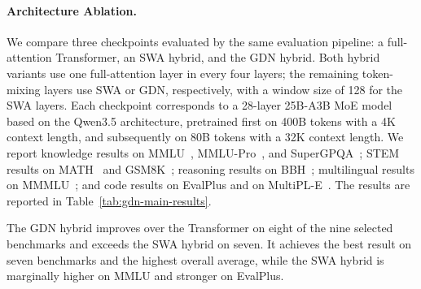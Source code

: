 \paragraph{Architecture Ablation.}
\label{sec:gdn-ablation}

We compare three checkpoints evaluated by the same evaluation pipeline: a full-attention Transformer, an SWA hybrid, and the GDN hybrid. Both hybrid variants use one full-attention layer in every four layers; the remaining token-mixing layers use SWA or GDN, respectively, with a window size of 128 for the SWA layers. Each checkpoint corresponds to a 28-layer 25B-A3B MoE model based on the Qwen3.5 architecture, pretrained first on 400B tokens with a 4K context length, and subsequently on 80B tokens with a 32K context length. We report knowledge results on MMLU~\citep{mmlu}, MMLU-Pro~\citep{wang2024mmlu}, and SuperGPQA~\citep{supergpqa}; STEM results on MATH~\citep{hendrycks2021measuring} and GSM8K~\citep{cobbe2021training}; reasoning results on BBH~\citep{suzgun2022bbh}; multilingual results on MMMLU~\citep{openai2024mmmlu}; and code results on EvalPlus and on MultiPL-E~\citep{cassano2023multipl}. The results are reported in Table~\ref{tab:gdn-main-results}.

\begin{table}[t]
\centering
\small
\setlength{\tabcolsep}{3.5pt}
\caption{Architecture comparison. All values are percentages and higher is better. EvalPlus and MultiPL-E are reported with pass@1-style aggregate fields. Avg. is the unweighted arithmetic mean across the nine benchmarks. Bold denotes the best result in each column.}
\label{tab:gdn-main-results}
\end{table}

The GDN hybrid improves over the Transformer on eight of the nine selected benchmarks and exceeds the SWA hybrid on seven. It achieves the best result on seven benchmarks and the highest overall average, while the SWA hybrid is marginally higher on MMLU and stronger on EvalPlus.
